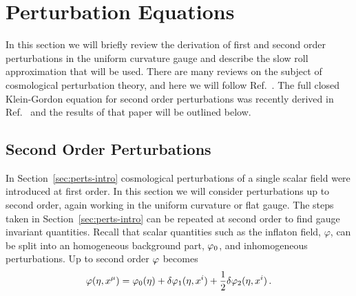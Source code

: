 % 
% 
% 
% 
\section{Perturbation Equations}
\label{sec:perts-num}


In this section we will briefly review the derivation of first and
second order perturbations in the uniform curvature gauge and describe
the slow roll approximation that will be used. There are
many reviews on the subject of cosmological perturbation theory, and
here we will follow Ref.~\cite{Malik:2008im}.  The full closed
Klein-Gordon equation for second order perturbations was recently
derived in Ref.~\cite{Malik:2006ir} and the results of that paper will be
outlined below.

\subsection{Second Order Perturbations}
\label{sec:fosoperts-num}
In Section~\ref{sec:perts-intro} cosmological perturbations of a single scalar field
were introduced at first order. In this section we will consider perturbations up to
second order, again working in the uniform curvature or flat
gauge. 
The steps taken in Section~\ref{sec:perts-intro} can be repeated at second order to
find gauge invariant quantities. Recall that scalar quantities such as the inflaton
field, $\varphi$, can be split into an homogeneous background part, $\varphi_0$, and
inhomogeneous perturbations. Up to second order $\varphi$ becomes
%  
\begin{equation}
 \varphi(\eta, x^\mu) = \varphi_0(\eta) + \delta\varphi_{1}(\eta, x^i) + \frac{1}{2}\delta\varphi_{2}(\eta, x^i)
\,.
\end{equation}

